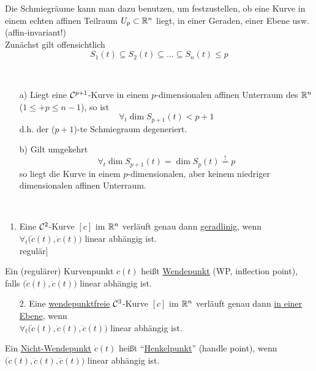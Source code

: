 Die Schmiegräume kann man dazu benutzen, um festzustellen, ob eine Kurve in einem echten affinen Teilraum \(U_p \subset \mathbb{R}^n\) liegt, in einer Geraden, einer Ebene usw. (affin-invariant!) \\
Zunächst gilt offensichtlich 
\[
 S_1(t) \subseteq S_2(t) \subseteq \dots \subseteq S_n(t) \le p
\]

\begin{satz}\label{satz112} \(\)
 \begin{enumerate}
  \item[a)] Liegt eine \(\mathcal{C}^{p+1}\)-Kurve in einem \(p\)-dimensionalen affinen Unterraum des \(\mathbb{R}^n\) (\(1 \le +p \le n-1 \)), so ist
  \[
   \forall_t \dim S_{p+1}(t) < p+1
  \]
  d.h. der (\(p+1\))-te Schmiegraum degeneriert.
  \item[b)] Gilt umgekehrt 
  \[
   \forall_t \dim S_{p+1}(t) = \dim S_p(t) \stackrel{!}{=} p
  \]
  so liegt die Kurve in einem \(p\)-dimensionalen, aber keinem niedriger dimensionalen affinen Unterraum.
 \end{enumerate}
\end{satz}

\begin{anwendung} \(\)
 \begin{enumerate}
  \item Eine \(\mathcal{C}^2\)-Kurve \([c]\) im \(\mathbb{R}^n\) verläuft genau dann \uline{geradlinig}, wenn \(\forall_t \big(\dot c(t), \ddot c(t)\big) \) linear abhängig ist. \\
  \big["`\(\Rightarrow\)"' nach a), "`\(\Leftarrow\)"' nach b), da \([c]\) regulär\big]
 \end{enumerate}
 \begin{definition}
  Ein (regulärer) Kurvenpunkt \(c(t)\) heißt \uline{Wendepunkt} (WP, inflection point), falls \(\big(\dot c(t), \ddot c(t)\big)\) linear abhängig ist.
 \end{definition}
 \begin{enumerate}
  \item[2.] Eine \uline{wendepunktfreie} \(\mathcal{C}^3\)-Kurve \([c]\) im \(\mathbb{R}^n\) verläuft genau dann \uline{in einer Ebene}, wenn \\ 
  \(\forall_t \big( \dot c(t), \ddot c(t), \dddot c(t) \big) \) linear abhängig ist.
 \end{enumerate}
 \begin{definition}
  Ein \uline{Nicht-Wendepunkt} \(\dot c(t)\) heißt "`\uline{Henkelpunkt}"' (handle point), wenn \( \big( \dot c(t), \ddot c(t), \dddot c(t) \big) \) linear abhängig ist.
 \end{definition}

\end{anwendung}

